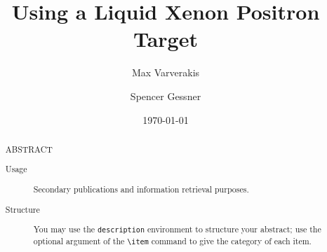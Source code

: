 \documentclass[%
reprint,
amsmath, amssymb,
aps,
]{revtex4-2}
\begin{document}

\title{Using a Liquid Xenon Positron Target}%

\author{Max Varverakis}
\author{Spencer Gessner}%
%




\date{\today}

\begin{abstract}
ABSTRACT
\begin{description}
\item[Usage]
Secondary publications and information retrieval purposes.
\item[Structure]
You may use the \texttt{description} environment to structure your abstract;
use the optional argument of the \verb+\item+ command to give the category of each item. 
\end{description}
\end{abstract}

\maketitle

\end{document}

